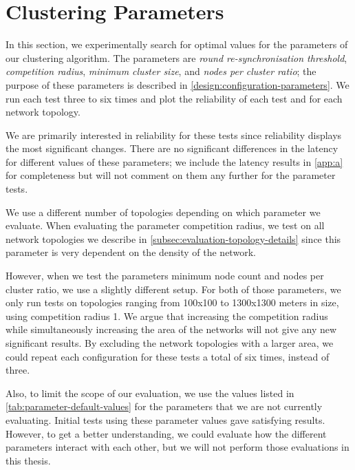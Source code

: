 \section{Clustering Parameters}
\label{sec:clustering-parameters}
In this section, we experimentally search for optimal values for the parameters of our clustering algorithm. The parameters are \emph{round re-synchronisation threshold}, \emph{competition radius}, \emph{minimum cluster size}, and \emph{nodes per cluster ratio}; the purpose of these parameters is described in \cref{design:configuration-parameters}. We run each test three to six times and plot the reliability of each test and for each network topology.

We are primarily interested in reliability for these tests since reliability displays the most significant changes. There are no significant differences in the latency for different values of these parameters; we include the latency results in \cref{app:a} for completeness but will not comment on them any further for the parameter tests.

We use a different number of topologies depending on which parameter we evaluate. When evaluating the parameter competition radius, we test on all network topologies we describe in \cref{subsec:evaluation-topology-details} since this parameter is very dependent on the density of the network.

However, when we test the parameters minimum node count and nodes per cluster ratio, we use a slightly different setup. For both of those parameters, we only run tests on topologies ranging from 100x100 to 1300x1300 meters in size, using competition radius 1. We argue that increasing the competition radius while simultaneously increasing the area of the networks will not give any new significant results. By excluding the network topologies with a larger area, we could repeat each configuration for these tests a total of six times, instead of three.

Also, to limit the scope of our evaluation, we use the values listed in \cref{tab:parameter-default-values} for the parameters that we are not currently evaluating. Initial tests using these parameter values gave satisfying results. However, to get a better understanding, we could evaluate how the different parameters interact with each other, but we will not perform those evaluations in this thesis.

